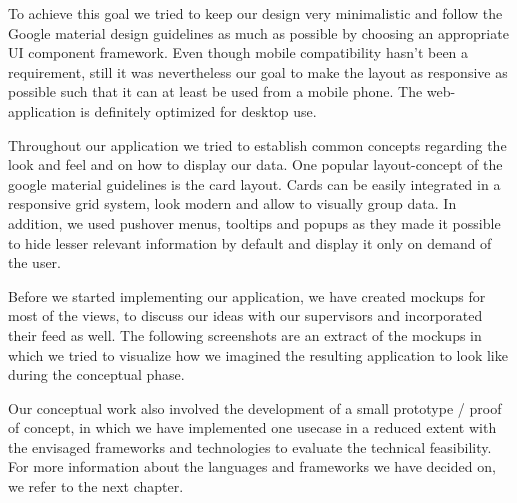 To achieve this goal we tried to keep our design very minimalistic and follow the Google material design guidelines as much as possible by choosing an appropriate UI component framework. Even though mobile compatibility hasn't been a requirement, still it was nevertheless our goal to make the layout as responsive as possible such that it can at least be used from a mobile phone. The web-application is definitely optimized for desktop use.

Throughout our application we tried to establish common concepts regarding the look and feel and on how to display our data. One popular layout-concept of the google material guidelines is the card layout. Cards can be easily integrated in a responsive grid system, look modern and allow to visually group data. In addition, we used pushover menus, tooltips and popups as they made it possible to hide lesser relevant information by default and display it only on demand of the user.

Before we started implementing our application, we have created mockups for most of the views, to discuss our ideas with our supervisors and incorporated their feed as well. The following screenshots are an extract of the mockups in which we tried to visualize how we imagined the resulting application to look like during the conceptual phase. 


Our conceptual work also involved the development of a small prototype / proof of concept, in which we have implemented one usecase in a reduced extent with the envisaged frameworks and technologies to evaluate the technical feasibility. For more information about the languages and frameworks we have decided on, we refer to the next chapter.